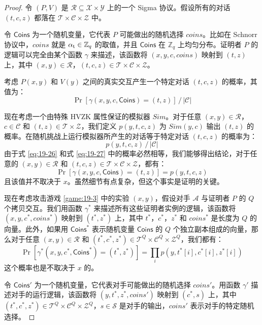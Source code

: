 \begin{proof}
令 $(P,V)$ 是 $\mathcal{R}\subseteq\mathcal{X}×\mathcal{Y}$ 上的一个 Sigma 协议。假设所有的对话 $(t,c,z)$ 都落在 $\mathcal{T}\times\mathcal{C}\times\mathcal{Z}$ 中。

令 $\mathsf{Coins}$ 为一个随机变量，它代表 $P$ 可能做出的随机选择 $coins$。比如在 Schnorr 协议中，$coins$ 就是 $\alpha_{\rm t}\in\mathbb{Z}_q$ 的取值，并且 $\mathsf{Coins}$ 在 $\mathbb{Z}_q$ 上均匀分布。证明者 $P$ 的逻辑可以完全由某个函数 $\gamma$ 来描述，该函数将 $(x,y,c,coins)$ 映射到 $(t,z)$ 上，其中 $(x,y)\in\mathcal{R}$，$(t,c,z)\in\mathcal{T}\times\mathcal{C}\times\mathcal{Z}$。

考虑 $P(x,y)$ 和 $V(y)$ 之间的真实交互产生一个特定对话 $(t,c,z)$ 的概率，其值为：
\begin{equation}\label{eq:19-26}
{\Pr[\gamma(x,y,c,\mathsf{Coins})=(t,z)]}\,/\,{|\mathcal{C}|}
\end{equation}


现在考虑一个由特殊 HVZK 属性保证的模拟器 $Sim$。对于任意 $(x,y)\in\mathcal{R}$，$c\in\mathcal{C}$ 和 $(t,z)\in\mathcal{T}\times\mathcal{Z}$，我们定义 $p(y,t,c,z)$ 为 $Sim(y,c)$ 输出 $(t,z)$ 的概率。在随机挑战上运行模拟器所产生的对话等于特定对话 $(t,c,z)$ 的概率为：
\begin{equation}\label{eq:19-27}
{p(y,t,c,z)}\,/\,{|\mathcal{C}|}
\end{equation}
由于式 \ref{eq:19-26} 和式 \ref{eq:19-27} 中的概率必然相等，我们能够得出结论，对于任意的 $(x,y)\in\mathcal{R}$ 和 $(t,c,z)\in\mathcal{T}\times\mathcal{C}\times\mathcal{Z}$，都有：
$$
\Pr[\gamma(x,y,c,\mathsf{Coins})=(t,z)]=p(y,t,c,z)
$$
且该值并不取决于 $x$。虽然细节有点复杂，但这个事实是证明的关键。

现在考虑攻击游戏 \ref{game:19-3} 中的实验 $(x,y)$，假设对手 $\mathcal{A}$ 与证明者 $P$ 的 $Q$ 个拷贝交互。我们用函数 $\gamma^*$ 来描述所有这些证明者实例的逻辑，该函数将 $(x,y,c^*,coins^*)$ 映射到 $(t^*,z^*)$ 上，其中 $t^*$，$c^*$，$z^*$ 和 $coins^*$ 是长度为 $Q$ 的向量。此外，如果用 $\mathsf{Coins}^*$ 表示随机变量 $\mathsf{Coins}$ 的 $Q$ 个独立副本组成的向量，那么对于任意 $(x,y)\in\mathcal{R}$ 和 $(t^*,c^*,z^*)\in\mathcal{T}^Q\times\mathcal{C}^Q\times\mathcal{Z}^Q$，我们都有：
$$
\Pr[\gamma^*(x,y,c^*,\mathsf{Coins}^*)=(t^*,z^*)]=\prod_{i}p(y,t^*[i],c^*[i], z^*[i])
$$
这个概率也是不取决于 $x$ 的。

令 $\mathsf{Coins}'$ 为一个随机变量，它代表对手可能做出的随机选择 $coins'$。用函数 $\gamma'$ 描述对手的运行逻辑，该函数将 $(y,t^*,z^*,coins')$ 映射到 $(c^*,s)$ 上，其中 $(t^*,c^*,z^*)\in\mathcal{T}^Q\times\mathcal{C}^Q\times\mathcal{Z}^Q$，$s\in\mathcal{S}$ 是对手的输出，$coins'$ 表示对手的特定随机选择。


\end{proof}
